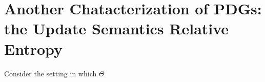     \label{chap:relent-soup}

\section{Another Chatacterization of PDGs: 
    the Update Semantics Relative Entropy}    

Consider the setting in which $\Theta$

\begin{prop}
    
\end{prop}

